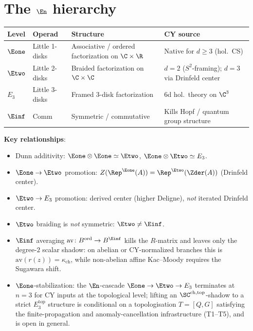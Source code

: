 \section{The \texorpdfstring{$\En$}{E-n} hierarchy}
\label{sec:nc-en}

\begin{center}
\begin{tabular}{@{}llll@{}}
\toprule
\textbf{Level} & \textbf{Operad} & \textbf{Structure} & \textbf{CY source} \\
\midrule
$\Eone$ & Little 1-disks & Associative / ordered factorization
 on $\C \times \R$ & Native for $d \ge 3$ (hol.\ CS) \\
$\Etwo$ & Little 2-disks & Braided factorization on
 $\C \times \C$ & $d = 2$ ($S^2$-framing); $d = 3$ via
 Drinfeld center \\
$E_3$ & Little 3-disks & Framed 3-disk factorization &
 6d hol.\ theory on $\C^3$ \\
$\Einf$ & $\mathrm{Comm}$ & Symmetric / commutative &
 Kills Hopf / quantum group structure \\
\bottomrule
\end{tabular}
\end{center}

\noindent
\textbf{Key relationships}:
\begin{itemize}[nosep]
\item Dunn additivity: $\Eone \otimes \Eone \simeq \Etwo$, \;
 $\Eone \otimes \Etwo \simeq E_3$.
\item $\Eone \to \Etwo$ promotion:
 $Z(\Rep^{\Eone}(A)) = \Rep^{\Etwo}(\Zder(A))$ (Drinfeld center).
\item $\Etwo \to E_3$ promotion: derived center (higher Deligne),
 \emph{not} iterated Drinfeld center.
\item $\Etwo$ braiding is \emph{not} symmetric: $\Etwo \neq \Einf$.
\item $\Einf$ averaging $\mathrm{av}\colon B^{\mathrm{ord}} \to B^{\Einf}$
 kills the $R$-matrix and leaves only the degree-$2$ scalar shadow:
 on abelian or CY-normalized branches this is
 $\mathrm{av}(r(z)) = \kappa_{\mathrm{ch}}$, while non-abelian affine
 Kac--Moody requires the Sugawara shift.
\item $\Eone$-stabilization: the $\En$-cascade $\Eone \to \Etwo \to E_3$
 terminates at $n = 3$ for CY inputs at the topological level; lifting an
 $\SC^{\mathrm{ch}, \mathrm{top}}$-shadow to a strict $E_3^{\mathrm{top}}$
 structure is conditional on a topologisation $T = [Q, G]$ satisfying the
 finite-propagation and anomaly-cancellation infrastructure
 (T1--T5), and is open in general.
\end{itemize}

